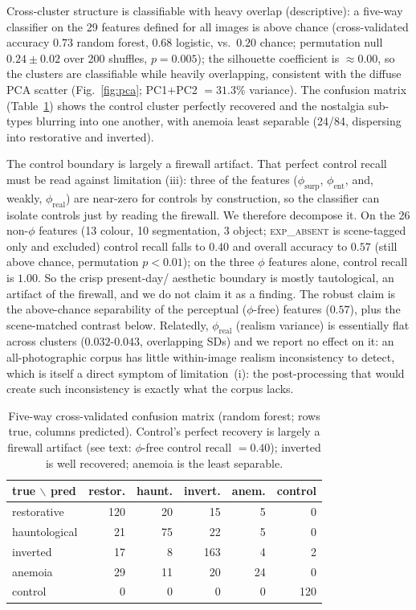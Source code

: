 \documentclass[11pt]{article}
\begin{document}
Cross-cluster structure is classifiable with heavy overlap (descriptive): a five-way
classifier on the 29 features defined for all images is above chance (cross-validated
accuracy $0.73$ random forest, $0.68$ logistic, vs.\ $0.20$ chance; permutation null
$0.24\pm0.02$ over 200 shuffles, $p=0.005$); the silhouette coefficient is
$\approx0.00$, so the clusters are classifiable while heavily overlapping, consistent with the
diffuse PCA scatter (Fig.~\ref{fig:pca}; PC1$+$PC2 $=31.3\%$ variance). The confusion
matrix (Table~\ref{tab:confusion}) shows the control cluster perfectly recovered and the
nostalgia sub-types blurring into one another, with anemoia least separable
(24/84, dispersing into restorative and inverted).

The control boundary is largely a firewall artifact. That perfect control
recall must be read against limitation (iii): three of the features ($\phi_{\text{surp}}$,
$\phi_{\text{ent}}$, and, weakly, $\phi_{\text{real}}$) are near-zero for controls
by construction, so the classifier can isolate controls just by reading the
firewall. We therefore decompose it. On the 26 non-$\phi$ features (13 colour,
10 segmentation, 3 object; \textsc{exp\_absent} is scene-tagged only and excluded) control
recall falls to $0.40$ and overall accuracy to $0.57$ (still above chance, permutation
$p<0.01$); on
the three $\phi$ features alone, control recall is $1.00$. So the crisp present-day/
aesthetic boundary is mostly tautological, an artifact of the firewall, and we do not
claim it as a finding. The robust claim is the above-chance separability
of the perceptual ($\phi$-free) features ($0.57$), plus the scene-matched contrast below.
Relatedly, $\phi_{\text{real}}$ (realism variance) is essentially flat across clusters
($0.032$-$0.043$, overlapping SDs) and we report no effect on it: an all-photographic
corpus has little within-image realism inconsistency to detect, which is itself a
direct symptom of limitation~(i): the post-processing that would create such
inconsistency is exactly what the corpus lacks.

\begin{table}[htbp]
\centering
\caption{Five-way cross-validated confusion matrix (random forest; rows true, columns
predicted). Control's perfect recovery is largely a firewall artifact (see text:
$\phi$-free control recall $=0.40$); inverted is well recovered; anemoia is the least
separable.}
\label{tab:confusion}
\small
\begin{tabular}{lrrrrr}
\toprule
true $\backslash$ pred & restor. & haunt. & invert. & anem. & control \\
\midrule
restorative   & 120 & 20 & 15 & 5 & 0 \\
hauntological & 21 & 75 & 22 & 5 & 0 \\
inverted      & 17 & 8 & 163 & 4 & 2 \\
anemoia       & 29 & 11 & 20 & 24 & 0 \\
control       & 0 & 0 & 0 & 0 & 120 \\
\bottomrule
\end{tabular}
\end{table}
\end{document}
